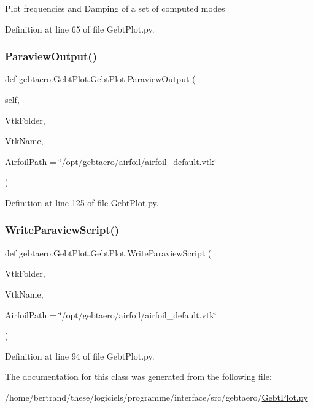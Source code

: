 \begin{DoxyVerb}Plot frequencies and Damping of a set of computed modes
\end{DoxyVerb}
 

Definition at line 65 of file Gebt\+Plot.\+py.

\mbox{\label{classgebtaero_1_1_gebt_plot_1_1_gebt_plot_ae78de8134989ce474d9a7d32b6f7e7c9}} 
\subsubsection{\texorpdfstring{Paraview\+Output()}{ParaviewOutput()}}
{\footnotesize\ttfamily def gebtaero.\+Gebt\+Plot.\+Gebt\+Plot.\+Paraview\+Output (\begin{DoxyParamCaption}\item[{}]{self,  }\item[{}]{Vtk\+Folder,  }\item[{}]{Vtk\+Name,  }\item[{}]{Airfoil\+Path = {\ttfamily \char`\"{}/opt/gebtaero/airfoil/airfoil\+\_\+default.vtk\char`\"{}} }\end{DoxyParamCaption})}



Definition at line 125 of file Gebt\+Plot.\+py.

\mbox{\label{classgebtaero_1_1_gebt_plot_1_1_gebt_plot_aada9da700e97eef6c59a4377098954af}} 
\subsubsection{\texorpdfstring{Write\+Paraview\+Script()}{WriteParaviewScript()}}
{\footnotesize\ttfamily def gebtaero.\+Gebt\+Plot.\+Gebt\+Plot.\+Write\+Paraview\+Script (\begin{DoxyParamCaption}\item[{}]{Vtk\+Folder,  }\item[{}]{Vtk\+Name,  }\item[{}]{Airfoil\+Path = {\ttfamily \char`\"{}/opt/gebtaero/airfoil/airfoil\+\_\+default.vtk\char`\"{}} }\end{DoxyParamCaption})}



Definition at line 94 of file Gebt\+Plot.\+py.



The documentation for this class was generated from the following file\+:\begin{DoxyCompactItemize}
\item 
/home/bertrand/these/logiciels/programme/interface/src/gebtaero/\hyperlink{_gebt_plot_8py}{Gebt\+Plot.\+py}\end{DoxyCompactItemize}

